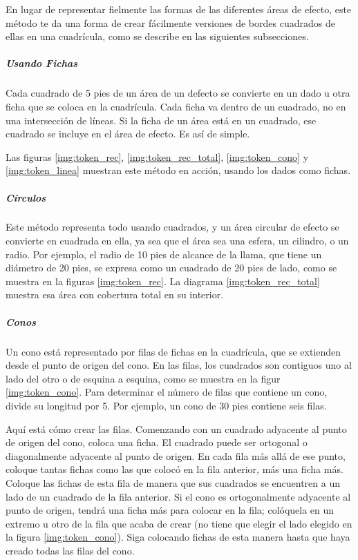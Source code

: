 \documentclass[a4paper,twocolumn,openany,10pt]{dndbook}
\begin{document}
En lugar de representar fielmente las formas de las diferentes áreas de efecto, este método te da una forma de crear fácilmente
versiones de bordes cuadrados de ellas en una cuadrícula, como se describe en las siguientes subsecciones. 

\subparagraph{Usando Fichas} Cada cuadrado de 5 pies de un área de un defecto se convierte en un dado u otra ficha que se coloca
en la cuadrícula. Cada ficha va dentro de un cuadrado, no en una intersección de líneas. Si la ficha de un área está en un
cuadrado, ese cuadrado se incluye en el área de efecto. Es así de simple.

Las figuras \ref{img:token_rec}, \ref{img:token_rec_total}, \ref{img:token_cono} y \ref{img:token_linea} muestran este método en
acción, usando los dados como fichas. 

\subparagraph{Círculos} Este método representa todo usando cuadrados, y un área circular de efecto se convierte en cuadrada en
ella, ya sea que el área sea una esfera, un cilindro, o un radio. Por ejemplo, el radio de 10 pies de alcance de la llama, que
tiene un diámetro de 20 pies, se expresa como un cuadrado de 20 pies de lado, como se muestra en la figuras \ref{img:token_rec}.
La diagrama \ref{img:token_rec_total} muestra esa área con cobertura total en su interior.

\subparagraph{Conos} Un cono está representado por filas de fichas en la cuadrícula, que se extienden desde el punto de origen
del cono. En las filas, los cuadrados son contiguos uno al lado del otro o de esquina a esquina, como se muestra en la figur
\ref{img:token_cono}. Para determinar el número de filas que contiene un cono, divide su longitud por 5. Por ejemplo, un cono de
30 pies contiene seis filas.

Aquí está cómo crear las filas. Comenzando con un cuadrado adyacente al punto de origen del cono, coloca una ficha. El cuadrado
puede ser ortogonal o diagonalmente adyacente al punto de origen. En cada fila más allá de ese punto, coloque tantas fichas como
las que colocó en la fila anterior, más una ficha más. Coloque las fichas de esta fila de manera que sus cuadrados se encuentren
a un lado de un cuadrado de la fila anterior. Si el cono es ortogonalmente adyacente al punto de origen, tendrá una ficha más
para colocar en la fila; colóquela en un extremo u otro de la fila que acaba de crear (no tiene que elegir el lado elegido en la
figura \ref{img:token_cono}). Siga colocando fichas de esta manera hasta que haya creado todas las filas del cono.
\end{document}

